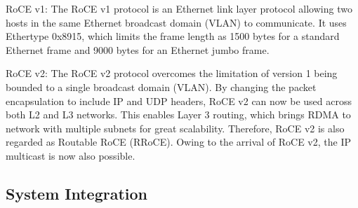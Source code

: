 RoCE v1: The RoCE v1 protocol is an Ethernet link layer protocol allowing two hosts in the same Ethernet broadcast domain (VLAN) to communicate. It uses Ethertype 0x8915, which limits the frame length as 1500 bytes for a standard Ethernet frame and 9000 bytes for an Ethernet jumbo frame.

RoCE v2: The RoCE v2 protocol overcomes the limitation of version 1 being bounded to a single broadcast domain (VLAN). By changing the packet encapsulation to include IP and UDP headers, RoCE v2 can now be used across both L2 and L3 networks. This enables Layer 3 routing, which brings RDMA to network with multiple subnets for great scalability. Therefore, RoCE v2 is also regarded as Routable RoCE (RRoCE). Owing to the arrival of RoCE v2, the IP multicast is now also possible.
\subsection{System Integration}


